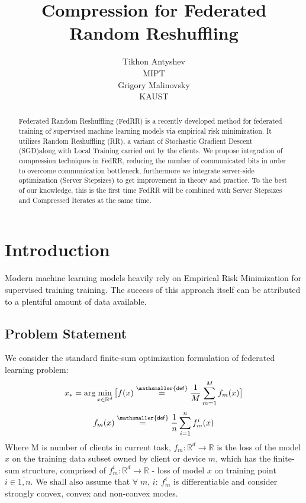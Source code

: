 \documentclass{article}
\title{Compression for Federated Random Reshuffling}
\author{ Tikhon Antyshev\\
	MIPT\\
	\And
	Grigory Malinovsky \\
	KAUST\\
}
\date{}
\newcommand*{\defeq}{\stackrel{\mathsmaller{\mathsf{def}}}{=}}
\begin{document}
\maketitle

\begin{abstract}
	Federated Random Reshuffling (FedRR) is a recently developed method for federated training of supervised machine learning models via empirical risk minimization. It utilizes Random Reshuffling (RR), a variant of Stochastic Gradient Descent (SGD)along with Local Training carried out by the clients. We propose integration of compression techniques in FedRR, reducing the number of communicated bits in order to overcome communication bottleneck, furthermore we integrate server-side optimization (Server Stepsizes) to get improvement in theory and practice. To the best of our knowledge, this is the first time FedRR will be combined with Server Stepsizes and Compressed Iterates at the same time. 

\end{abstract}



\section{Introduction}
Modern machine learning models heavily rely on Empirical Risk Minimization for supervised training training. The  success of this approach itself can be attributed to a plentiful amount of data available.

\subsection{Problem Statement}
We consider the standard finite-sum optimization formulation of
federated learning problem:
\[
    x_* = \arg\min_{x \in \mathbb{R}^d}\big[f(x) \defeq \frac{1}{M}\sum_{m=1}^M f_m(x) \big]
\]
\[f_m(x) \defeq \frac{1}{n}\sum_{i = 1}^n f_m^i(x)\]
Where M is number of clients in current task, $f_m:\mathbb{R}^d \rightarrow \mathbb{R}$ is the loss of the model $x$ on the training data subset owned by client or device $m$, which has the finite-sum structure, comprised of $f_m^i: \mathbb{R}^d \rightarrow \mathbb{R}$ - loss of model $x$ on training point $i \in \overline{1, n}$. We shall also assume that $ \forall \; m,\, i:\: f_m^i$ is differentiable and consider strongly convex, convex and non-convex modes.
\end{document}
